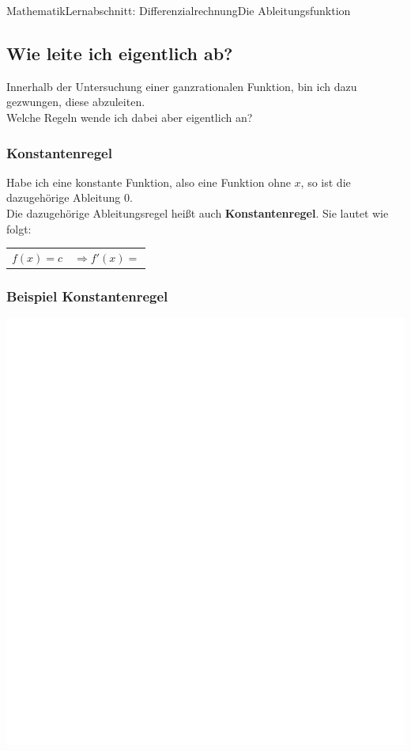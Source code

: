 \documentclass[11pt,twocolumn,oneside,openany,headings=optiontotoc,11pt,numbers=noenddot]{article}
\begin{document}
	\begin{worksheet}{Mathematik}{Lernabschnitt: Differenzialrechnung}{Die Ableitungsfunktion}
		\setcounter{section}{7}
		\setcounter{subsection}{2}
		\subsection{Wie leite ich eigentlich ab?}
		Innerhalb der Untersuchung einer ganzrationalen Funktion, bin ich dazu gezwungen, diese abzuleiten.\\
		Welche Regeln wende ich dabei aber eigentlich an?
		\subsubsection{Konstantenregel}
		Habe ich eine konstante Funktion, also eine Funktion ohne \(x\), so ist die dazugehörige Ableitung \(0\).\\
		Die dazugehörige Ableitungsregel heißt auch \textbf{Konstantenregel}. Sie lautet wie folgt:
		\begin{framed}
			\noindent
			\begin{tabularx}{0.7\textwidth}{XX}
				\(f(x) = c\) & \(\Rightarrow f'(x) = \)\\
			\end{tabularx}
		\end{framed}
		\subsubsection*{Beispiel Konstantenregel}
		\includegraphics[scale=0.2]{../../empty.jpg}\\

\end{worksheet}
\end{document}
